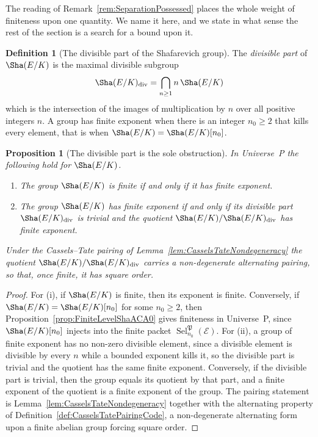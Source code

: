 \documentclass[10pt, reqno]{amsart}
\theoremstyle{plain}
\newtheorem{proposition}[theorem]{Proposition}
\theoremstyle{definition}
\newtheorem{definition}[theorem]{Definition}
\theoremstyle{plain}
\newcommand{\Sel}{\operatorname{Sel}}
\begin{document}
The reading of Remark~\ref{rem:SeparationPossessed} places the whole weight of finiteness upon one quantity. We name it here, and we state in what sense the rest of the section is a search for a bound upon it.

\begin{definition}[The divisible part of the Shafarevich group]
\label{def:DivisibleSubgroupSha}
The \emph{divisible part} of $\Sha(E/K)$ is the maximal divisible subgroup
\[
  \Sha(E/K)_{\mathrm{div}}
  =
  \bigcap_{n\ge 1} n\,\Sha(E/K)
\]
which is the intersection of the images of multiplication by $n$ over all positive integers $n$. A group has finite exponent when there is an integer $n_{0}\ge 2$ that kills every element, that is when $\Sha(E/K)=\Sha(E/K)[n_{0}]$.
\end{definition}

\begin{proposition}[The divisible part is the sole obstruction]
\label{prop:DivisiblePartSoleObstruction}
In Universe~P the following hold for $\Sha(E/K)$.
\begin{enumerate}
\item[(i)] The group $\Sha(E/K)$ is finite if and only if it has finite exponent.
\item[(ii)] The group $\Sha(E/K)$ has finite exponent if and only if its divisible part $\Sha(E/K)_{\mathrm{div}}$ is trivial and the quotient $\Sha(E/K)/\Sha(E/K)_{\mathrm{div}}$ has finite exponent.
\end{enumerate}
Under the Cassels--Tate pairing of Lemma~\ref{lem:CasselsTateNondegeneracy} the quotient $\Sha(E/K)/\Sha(E/K)_{\mathrm{div}}$ carries a non-degenerate alternating pairing, so that, once finite, it has square order.
\end{proposition}

\begin{proof}
For \textup{(i)}, if $\Sha(E/K)$ is finite, then its exponent is finite. Conversely, if $\Sha(E/K)=\Sha(E/K)[n_{0}]$ for some $n_{0}\ge 2$, then Proposition~\ref{prop:FiniteLevelShaACA0} gives finiteness in Universe~P, since $\Sha(E/K)[n_{0}]$ injects into the finite packet $\Sel^{\mathfrak{P}}_{n_{0}}(\mathcal{E})$. For \textup{(ii)}, a group of finite exponent has no non-zero divisible element, since a divisible element is divisible by every $n$ while a bounded exponent kills it, so the divisible part is trivial and the quotient has the same finite exponent. Conversely, if the divisible part is trivial, then the group equals its quotient by that part, and a finite exponent of the quotient is a finite exponent of the group. The pairing statement is Lemma~\ref{lem:CasselsTateNondegeneracy} together with the alternating property of Definition~\ref{def:CasselsTatePairingCode}, a non-degenerate alternating form upon a finite abelian group forcing square order.
\end{proof}
\end{document}

